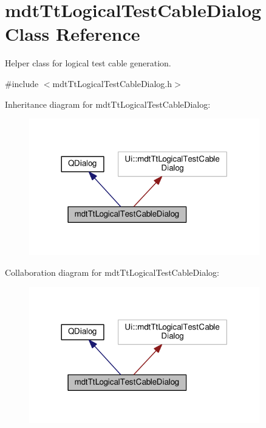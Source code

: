 \hypertarget{classmdt_tt_logical_test_cable_dialog}{\section{mdt\-Tt\-Logical\-Test\-Cable\-Dialog Class Reference}
\label{classmdt_tt_logical_test_cable_dialog}
}


Helper class for logical test cable generation.  




{\ttfamily \#include $<$mdt\-Tt\-Logical\-Test\-Cable\-Dialog.\-h$>$}



Inheritance diagram for mdt\-Tt\-Logical\-Test\-Cable\-Dialog\-:\nopagebreak
\begin{figure}[H]
\begin{center}
\leavevmode
\includegraphics[width=284pt]{classmdt_tt_logical_test_cable_dialog__inherit__graph}
\end{center}
\end{figure}


Collaboration diagram for mdt\-Tt\-Logical\-Test\-Cable\-Dialog\-:\nopagebreak
\begin{figure}[H]
\begin{center}
\leavevmode
\includegraphics[width=284pt]{classmdt_tt_logical_test_cable_dialog__coll__graph}
\end{center}
\end{figure}
